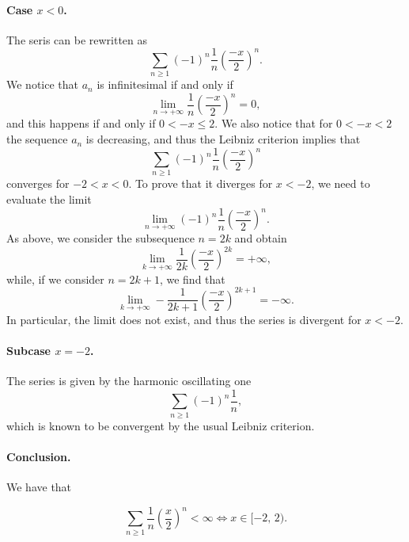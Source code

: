 \documentclass[a4paper,10 pt]{report}
\newcommand{\finalanswer}[1]{%
    \begin{finalAnswer}
    \[
        #1
    \]
    \end{finalAnswer}
}
\theoremstyle{definition}
\begin{document}
\begin{solutionBox}
\paragraph{Case $x < 0$.} The seris can be rewritten as
\begin{equation*} \sum_{n \geq 1} (-1)^n \frac{1}{n} \left( \frac{-x}{2} \right)^n. \end{equation*}
We notice that $a_n$ is infinitesimal if and only if
\begin{equation*} \lim_{n \to + \infty}  \frac{1}{n} \left( \frac{-x}{2} \right)^n = 0, \end{equation*}
and this happens if and only if $0 < -x \leq 2$. We also notice that for $0 < - x < 2$ the sequence $a_n$ is decreasing, and thus the Leibniz criterion implies that
\begin{equation*} \sum_{n \geq 1} (-1)^n \frac{1}{n} \left( \frac{-x}{2} \right)^n \end{equation*}
converges for $-2 < x < 0$. To prove that it diverges for $x < - 2$, we need to evaluate the limit
\begin{equation*} \lim_{n \to + \infty} (-1)^n \frac{1}{n} \left( \frac{-x}{2} \right)^n. \end{equation*}
As above, we consider the subsequence $n = 2k$ and obtain
\begin{equation*} \lim_{k \to + \infty} \frac{1}{2k} \left( \frac{-x}{2} \right)^{2k} = + \infty, \end{equation*}
while, if we consider $n = 2k + 1$, we find that
\begin{equation*} \lim_{k \to + \infty}- \frac{1}{2k + 1} \left( \frac{-x}{2} \right)^{2k + 1} = - \infty. \end{equation*}
In particular, the limit does not exist, and thus the series is divergent for $x < -2$.

\paragraph{Subcase $x = - 2$.} The series is given by the harmonic oscillating one
\begin{equation*} \sum_{n \geq 1} (-1)^n \frac{1}{n} , \end{equation*}
which is known to be convergent by the usual Leibniz criterion.

\paragraph{Conclusion.} We have that
\finalanswer{
 \sum_{n \geq 1} \frac{1}{n} \left( \frac{x}{2} \right)^n < \infty \iff x \in [-2, \, 2).
}
\end{solutionBox}
\end{document}

